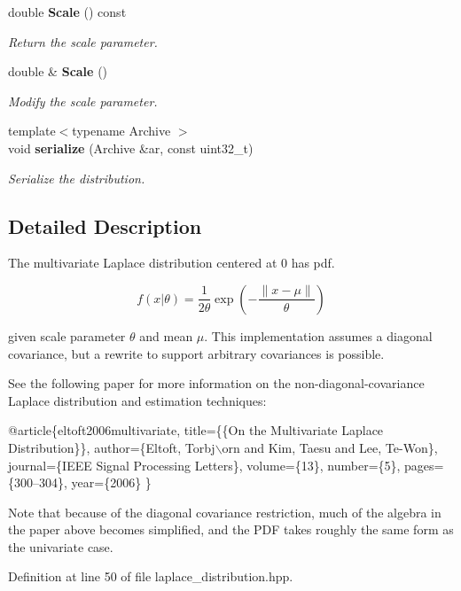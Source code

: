 \begin{DoxyCompactItemize}
double \textbf{ Scale} () const
\begin{DoxyCompactList}\small\item\em Return the scale parameter. \end{DoxyCompactList}\item 
double \& \textbf{ Scale} ()
\begin{DoxyCompactList}\small\item\em Modify the scale parameter. \end{DoxyCompactList}\item 
{\footnotesize template$<$typename Archive $>$ }\\void \textbf{ serialize} (Archive \&ar, const uint32\+\_\+t)
\begin{DoxyCompactList}\small\item\em Serialize the distribution. \end{DoxyCompactList}\end{DoxyCompactItemize}


\subsection{Detailed Description}
The multivariate Laplace distribution centered at 0 has pdf. 

\[ f(x|\theta) = \frac{1}{2 \theta}\exp\left(-\frac{\|x - \mu\|}{\theta}\right) \]

given scale parameter $\theta$ and mean $\mu$. This implementation assumes a diagonal covariance, but a rewrite to support arbitrary covariances is possible.

See the following paper for more information on the non-\/diagonal-\/covariance Laplace distribution and estimation techniques\+:


\begin{DoxyCode}
@article\{eltoft2006multivariate,
  title=\{\{On the Multivariate Laplace Distribution\}\},
  author=\{Eltoft, Torbj\(\backslash\)orn and Kim, Taesu and Lee, Te-Won\},
  journal=\{IEEE Signal Processing Letters\},
  volume=\{13\},
  number=\{5\},
  pages=\{300--304\},
  year=\{2006\}
\}
\end{DoxyCode}


Note that because of the diagonal covariance restriction, much of the algebra in the paper above becomes simplified, and the P\+DF takes roughly the same form as the univariate case. 

Definition at line 50 of file laplace\+\_\+distribution.\+hpp.




